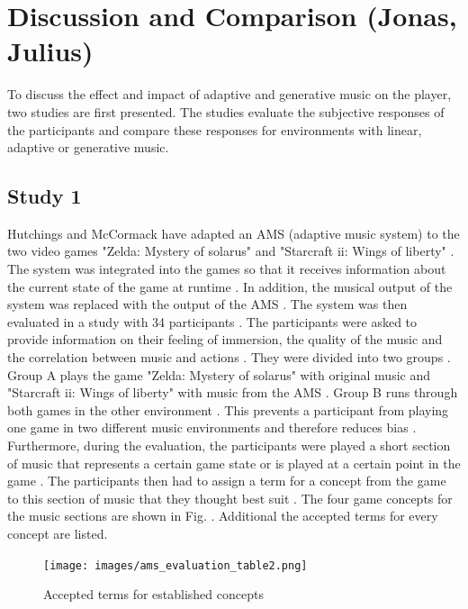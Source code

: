 \section{Discussion and Comparison (Jonas, Julius)}

To discuss the effect and impact of adaptive and generative music on the player, two studies are first presented. The studies evaluate the subjective responses of the participants and compare these responses for environments with linear, adaptive or generative music.

\subsection{Study 1}
Hutchings and McCormack have adapted an AMS (adaptive music system) to the two video games "Zelda: Mystery of solarus" \cite{zeldamysteryofsolarus2011}  and "Starcraft ii: Wings of liberty" \cite{starcraftiiwingsofliberty} \cite{hutMcCormAms}. The system was integrated into the games so that it receives information about the current state of the game at runtime \cite{hutMcCormAms}. In addition, the musical output of the system was replaced with the output of the AMS \cite{hutMcCormAms}. 
The system was then evaluated in a study with 34 participants \cite{hutMcCormAms}. The participants were asked to provide information on their feeling of immersion, the quality of the music and the correlation between music and actions \cite{hutMcCormAms}. They were divided into two groups \cite{hutMcCormAms}. Group A plays the game "Zelda: Mystery of solarus" with original music and "Starcraft ii: Wings of liberty" with music from the AMS \cite{hutMcCormAms}. Group B runs through both games in the other environment \cite{hutMcCormAms}. This prevents a participant from playing one game in two different music environments and therefore reduces bias \cite{hutMcCormAms}.
Furthermore, during the evaluation, the participants were played a short section of music that represents a certain game state or is played at a certain point in the game \cite{hutMcCormAms}. The participants then had to assign a term for a concept from the game to this section of music that they thought best suit \cite{hutMcCormAms}. The four game concepts for the music sections are shown in Fig. . Additional the accepted terms for every concept are listed. 
\begin{figure}
    \centering
    \texttt{[image: images/ams\_evaluation\_table2.png]}
    \caption{Accepted terms for established concepts \cite{hutMcCormAms}}
    \label{fig:ams_evaluation_table2}
\end{figure}
